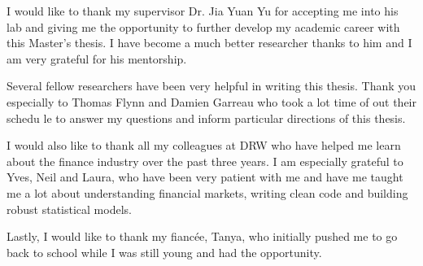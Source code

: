 \begin{acknowledgments}
  
  I would like to thank my supervisor Dr. Jia Yuan Yu for accepting me into his lab and giving me the opportunity to further develop my academic career with this Master's thesis. I have become a much better researcher thanks to him and I am very grateful for his mentorship.
  
Several fellow researchers have been very helpful in writing this thesis. Thank you especially to Thomas Flynn and Damien Garreau who took a lot time of out their schedu	le to answer my questions and inform particular directions of this thesis.
  
I would also like to thank all my colleagues at DRW who have helped me learn about the finance industry over the past three years. I am especially grateful to Yves, Neil and Laura, who have been very patient with me and have me taught me a lot about understanding financial markets, writing clean code and building robust statistical models.
  
Lastly, I would like to thank my fiancée, Tanya, who initially pushed me to go back to school while I was still young and had the opportunity. 
\end{acknowledgments}
